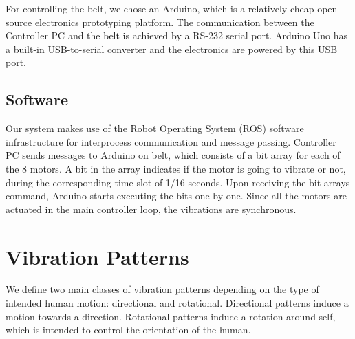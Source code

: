 For controlling the belt, we chose an Arduino, which is a relatively cheap open source electronics prototyping platform. The communication between the Controller PC and the belt is achieved by a RS-232 serial port. Arduino Uno has a built-in USB-to-serial converter and the electronics are powered by this USB port.

\subsection{Software}

Our system makes use of the Robot Operating System (ROS) software infrastructure for interprocess communication and message passing. Controller PC sends messages to Arduino on belt, which consists of a bit array for each of the 8 motors. A bit in the array indicates if the motor is going to vibrate or not, during the corresponding time slot of 1/16 seconds. Upon receiving the bit arrays command, Arduino starts executing the bits one by one. Since all the motors are actuated in the main controller loop, the vibrations are synchronous.

\section{Vibration Patterns}

We define two main classes of vibration patterns depending on the type of intended human motion: directional and rotational. Directional patterns induce a motion towards a direction. Rotational patterns induce a rotation around self, which is intended to control the orientation of the human. 




